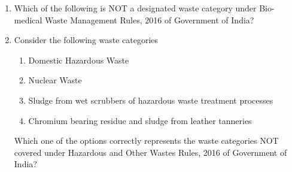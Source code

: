 \documentclass[journal,12pt,onecolumn]{IEEEtran}
\theoremstyle{remark}
\begin{document}
\begin{enumerate}
\begin{enumerate}
\end{enumerate}
\hfill{}

\item Which of the following is NOT a designated waste category under Bio-medical Waste Management Rules, 2016 of Government of India?

\begin{enumerate}
\end{enumerate}
\hfill{}

\item Consider the following waste categories

\begin{enumerate}[label=\roman*.]
\item Domestic Hazardous Waste
\item Nuclear Waste
\item Sludge from wet scrubbers of hazardous waste treatment processes
\item Chromium bearing residue and sludge from leather tanneries
\end{enumerate}

Which one of the options correctly represents the waste categories NOT covered under Hazardous and Other Wastes  Rules, 2016 of Government of India?

\begin{enumerate}
\end{enumerate}
\hfill{}


\end{enumerate}
\end{document}
